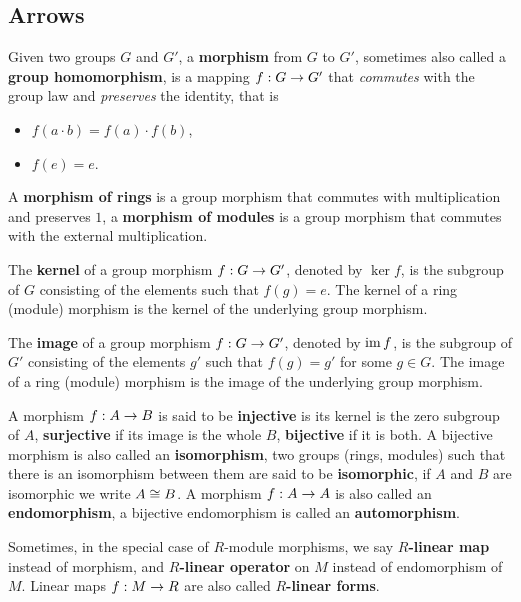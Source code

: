 \subsection{Arrows}
\label{sec:ring-fields:arrows}

Given two groups $G$ and $G'$, a
\textbf{morphism} from $G$ to $G'$,
sometimes also called a
\textbf{group homomorphism}, is a
mapping $f:G\rightarrow G'$ that \emph{commutes} with the group law and
\emph{preserves} the identity, that is
\begin{itemize}
\item $f(a\cdot b) = f(a) \cdot f(b)$,
\item $f(e) = e$.
\end{itemize}

A \textbf{morphism of rings} is a group
morphism that commutes with multiplication and preserves $1$, a
\textbf{morphism of modules} is a group
morphism that commutes with the external multiplication.

The \textbf{kernel} of a group morphism $f:G\rightarrow G'$,
denoted by $\ker f$, is the subgroup of $G$ consisting of the elements
such that $f(g)=e$. The kernel of a ring (module) morphism is the
kernel of the underlying group morphism.

The \textbf{image} of a group morphism $f:G\rightarrow G'$,
denoted by $\operatorname{im} f$, is the subgroup of $G'$ consisting of the elements
$g'$ such that $f(g)=g'$ for some $g\in G$. The image of a ring
(module) morphism is the image of the underlying group morphism.

A morphism $f:A\rightarrow B$ is said to be
\textbf{injective} is its kernel is the zero
subgroup of $A$, \textbf{surjective} if its
image is the whole $B$, \textbf{bijective}
if it is both. A bijective morphism is also called an
\textbf{isomorphism}, two groups (rings, modules)
such that there is an isomorphism between them are said to be
\textbf{isomorphic}, if $A$ and $B$ are isomorphic
we write $A\cong B$. A morphism $f:A\rightarrow A$ is also called an
\textbf{endomorphism}, a bijective endomorphism is
called an
\textbf{automorphism}. 

Sometimes, in the special case of $R$-module morphisms, we say
\textbf{$R$-linear map} instead of morphism, and
\textbf{$R$-linear operator} on $M$ instead of
endomorphism of $M$. Linear maps $f:M\rightarrow R$ are also called
 \textbf{$R$-linear
  forms}.

